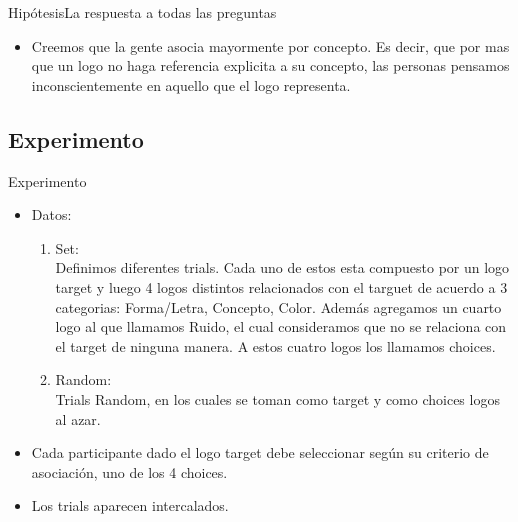 \documentclass{beamer}
\begin{document}
\begin{frame}{Hipótesis}{La respuesta a todas las preguntas}
  \begin{itemize}
  \item {

Creemos que la gente asocia mayormente por concepto. Es decir, que por mas que un logo no haga referencia explicita a su concepto, las personas pensamos inconscientemente en aquello que el logo representa. 


  }

 
  \end{itemize}
\end{frame}

\subsection{Experimento}

\begin{frame}{Experimento}

\begin{itemize}
\item{Datos: 
	\begin{enumerate}
	\item {Set: \\
	Definimos diferentes trials. Cada uno de estos esta compuesto por un logo target y luego 4 logos distintos relacionados con el targuet de acuerdo a 3 categorias: Forma/Letra, Concepto, Color. Además agregamos un cuarto logo al que llamamos Ruido, el cual consideramos que no se relaciona con el target de ninguna manera. A estos cuatro logos los llamamos choices.
    \pause %
  }
	\item {Random: \\
Trials Random, en los cuales se toman como target y como choices logos al azar. 
	}
\end{enumerate} 
}
 \pause 
\item {
	Cada participante dado el logo target debe seleccionar según su criterio de asociación, uno de los 4 choices.
  }
    \pause %
\item {Los trials aparecen intercalados.  
}



\end{itemize}



  

\end{frame}
\end{document}
